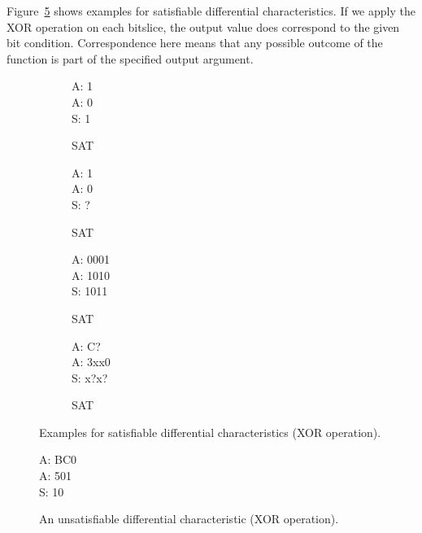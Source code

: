 Figure~\ref{dc:xor-examples} shows examples for satisfiable differential characteristics. If we apply the XOR operation on each bitslice, the output value does correspond to the given bit condition. Correspondence here means that any possible outcome of the function is part of the specified output argument.
%
\begin{figure}[t]
  \begin{center}
    \begin{subfigure}[b]{0.23\textwidth}
      \begin{diffchar}
        A: 1 \\
        A: 0 \\
        S: 1
      \end{diffchar}
      \caption{SAT}
      \label{dc:xor1}
    \end{subfigure}%
    \begin{subfigure}[b]{0.23\textwidth}
      \begin{diffchar}
        A: 1 \\
        A: 0 \\
        S: ?
      \end{diffchar}
      \caption{SAT}
      \label{dc:xor2}
    \end{subfigure}%
    \begin{subfigure}[b]{0.23\textwidth}
      \begin{diffchar}
        A: 0001 \\
        A: 1010 \\
        S: 1011
      \end{diffchar}
      \caption{SAT}
      \label{dc:xor3}
    \end{subfigure}%
    \begin{subfigure}[b]{0.23\textwidth}
      \begin{diffchar}
        A: C\textendash{}\textendash{}? \\
        A: 3xx0 \\
        S: x?x?
      \end{diffchar}
      \caption{SAT}
      \label{dc:xor4}
    \end{subfigure}
    \caption{Examples for satisfiable differential characteristics (XOR operation).}
    \label{dc:xor-examples}
  \end{center}
\end{figure}
\begin{figure}[t]
  \begin{center}
    \begin{diffchar}
      A: BC0 \\
      A: 501 \\
      S: \textendash{}10
    \end{diffchar}
    \caption{An unsatisfiable differential characteristic (XOR operation).}
    \label{dc:xor-faulty}
  \end{center}
\end{figure}

